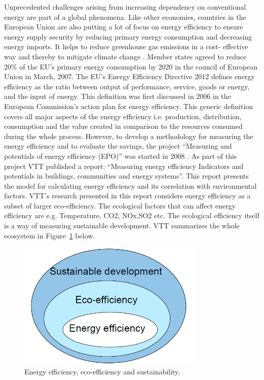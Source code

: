 Unprecedented challenges arising from increasing dependency on conventional energy are part of a global phenomena. Like other economies, countries in the European Union are also putting a lot of focus on energy efficiency to ensure energy supply security  by reducing primary energy consumption and decreasing energy imports. It helps to reduce greenhouse gas emissions in a cost- effective way and thereby to mitigate climate change \cite{eu2012ee}. Member states agreed to reduce 20\% of the EU's primary energy consumption by 2020 in the council of European Union in March, 2007. The EU's Energy Efficiency Directive 2012 \cite{eu2012ee} defines energy efficiency as the ratio between output of performance, service, goods or energy, and the input of energy. This definition was first discussed in 2006 in the European Commission's action plan for energy efficiency. This generic definition covers all major aspects of the energy efficiency i.e. production, distribution, consumption and the value created in comparison to the resources consumed during the whole process.  However, to develop a methodology for measuring the energy efficiency and to evaluate the savings, the project ``Measuring and potentials of energy efficiency (EPO)'' was started in 2008 \cite{arundel2009measuring}. As part of this project VTT published a report: ``Measuring energy efficiency Indicators and potentials in buildings, communities and energy systems''\cite{forsstrommeasuring}. This report presents the model for calculating energy efficiency and its correlation with environmental factors.  VTT's research presented in this report considers energy efficiency as a subset of larger eco-efficiency. The ecological factors that can affect energy efficiency are e.g.  Temperature, CO2, NOx,SO2 etc. The ecological efficiency itself is a way of measuring sustainable development. VTT summarizes the whole ecosystem in Figure~\ref{fig:eco-effeciency} below.

\begin{figure}[ht]
  \begin{center}
    \includegraphics[width=0.8\textwidth]{images/eco-effeciency.png}
    \caption{ Energy efficiency, eco-efficiency and sustainability\cite{forsstrommeasuring}.}
    \label{fig:eco-effeciency}
  \end{center}
\end{figure}

